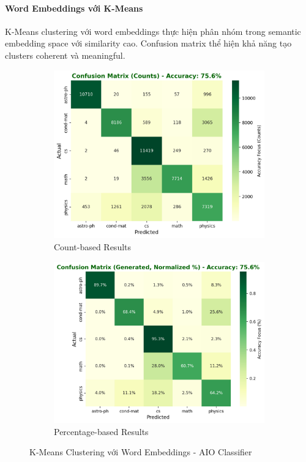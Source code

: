 \paragraph{Word Embeddings với K-Means}

K-Means clustering với word embeddings thực hiện phân nhóm trong semantic embedding space với similarity cao. Confusion matrix thể hiện khả năng tạo clusters coherent và meaningful.

\begin{figure}[H]
\centering
\begin{subfigure}{0.48\textwidth}
    \centering
    \includegraphics[width=\textwidth]{image/Kmean_embed_count.png}
    \caption{Count-based Results}
    \label{fig:kmeans_embed_count_improvements}
\end{subfigure}
\hfill
\begin{subfigure}{0.48\textwidth}
    \centering
    \includegraphics[width=\textwidth]{image/Kmean_embed_percent.png}
    \caption{Percentage-based Results}
    \label{fig:kmeans_embed_percent_improvements}
\end{subfigure}
\caption{K-Means Clustering với Word Embeddings - AIO Classifier}
\label{fig:kmeans_embed_results_improvements}
\end{figure}

